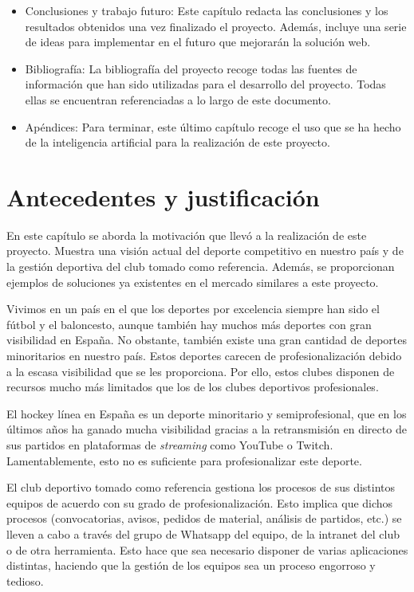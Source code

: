 \begin{itemize}
  \item Conclusiones y trabajo futuro: Este capítulo redacta las conclusiones y los resultados obtenidos una vez finalizado el proyecto. Además, incluye una serie de ideas para implementar en el futuro que mejorarán la solución web.
  \item Bibliografía: La bibliografía del proyecto recoge todas las fuentes de información que han sido utilizadas para el desarrollo del proyecto. Todas ellas se encuentran referenciadas a lo largo de este documento.
  \item Apéndices: Para terminar, este último capítulo recoge el uso que se ha hecho de la inteligencia artificial para la realización de este proyecto.
\end{itemize}

\chapter{Antecedentes y justificación}

En este capítulo se aborda la motivación que llevó a la realización de este proyecto. Muestra una visión actual del deporte competitivo en nuestro país y de la gestión deportiva del club tomado como referencia. Además, se proporcionan ejemplos de soluciones ya existentes en el mercado similares a este proyecto.

Vivimos en un país en el que los deportes por excelencia siempre han sido el fútbol y el baloncesto, aunque también hay muchos más deportes con gran visibilidad en España. No obstante, también existe una gran cantidad de deportes minoritarios en nuestro país. Estos deportes carecen de profesionalización debido a la escasa visibilidad que se les proporciona. Por ello, estos clubes disponen de recursos mucho más limitados que los de los clubes deportivos profesionales.

El hockey línea en España es un deporte minoritario y semiprofesional, que en los últimos años ha ganado mucha visibilidad gracias a la retransmisión en directo de sus partidos en plataformas de \textit{streaming} como YouTube o Twitch. Lamentablemente, esto no es suficiente para profesionalizar este deporte.

El club deportivo tomado como referencia gestiona los procesos de sus distintos equipos de acuerdo con su grado de profesionalización. Esto implica que dichos procesos (convocatorias, avisos, pedidos de material, análisis de partidos, etc.) se lleven a cabo a través del grupo de Whatsapp del equipo, de la intranet del club o de otra herramienta. Esto hace que sea necesario disponer de varias aplicaciones distintas, haciendo que la gestión de los equipos sea un proceso engorroso y tedioso.

